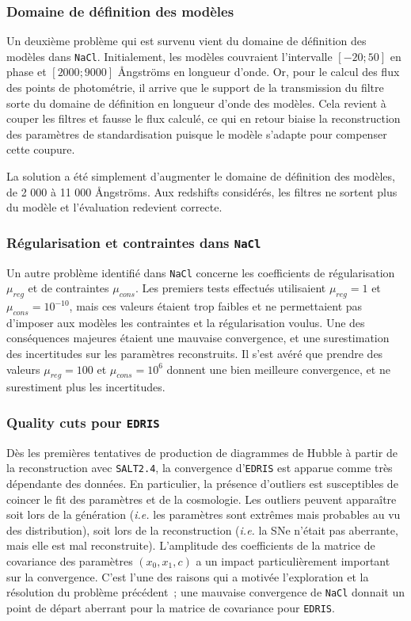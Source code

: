 \documentclass{book}
\def\nacl{\texttt{NaCl}\xspace}
\def\edris{\texttt{EDRIS}\xspace}
\def\saltd{\texttt{SALT2.4}\xspace}
\begin{document}
\subsubsection{Domaine de définition des modèles}

Un deuxième problème qui est survenu vient du domaine de définition des modèles dans \nacl. Initialement, les modèles couvraient l'intervalle $[-20; 50]$ en phase et $[2000; 9000]$ Ångströms en longueur d'onde. Or, pour le calcul des flux des points de photométrie, il arrive que le support de la transmission du filtre sorte du domaine de définition en longueur d'onde des modèles. Cela revient à couper les filtres et fausse le flux calculé, ce qui en retour biaise la reconstruction des paramètres de standardisation puisque le modèle s'adapte pour compenser cette coupure.

La solution a été simplement d'augmenter le domaine de définition des modèles, de 2 000 à 11 000 Ångströms. Aux redshifts considérés, les filtres ne sortent plus du modèle et l'évaluation redevient correcte.

\subsubsection{Régularisation et contraintes dans \nacl}

Un autre problème identifié dans \nacl concerne les coefficients de régularisation $\mu_{reg}$ et de contraintes $\mu_{cons}$. Les premiers tests effectués utilisaient $\mu_{reg} = 1$ et $\mu_{cons} = 10^{-10}$, mais ces valeurs étaient trop faibles et ne permettaient pas d'imposer aux modèles les contraintes et la régularisation voulus. Une des conséquences majeures étaient une mauvaise convergence, et une surestimation des incertitudes sur les paramètres reconstruits.
Il s'est avéré que prendre des valeurs $\mu_{reg} = 100$ et $\mu_{cons} = 10^6$ donnent une bien meilleure convergence, et ne surestiment plus les incertitudes.

\subsubsection{Quality cuts pour \edris}
\label{sec:qc_edris}
Dès les premières tentatives de production de diagrammes de Hubble à partir de la reconstruction avec \saltd, la convergence d'\edris est apparue comme très dépendante des données. En particulier, la présence d'outliers est susceptibles de coincer le fit des paramètres et de la cosmologie. Les outliers peuvent apparaître soit lors de la génération (\textit{i.e.} les paramètres sont extrêmes mais probables au vu des distribution), soit lors de la reconstruction (\textit{i.e.} la SNe n'était pas aberrante, mais elle est mal reconstruite). L'amplitude des coefficients de la matrice de covariance des paramètres $(x_0, x_1, c)$ a un impact particulièrement important sur la convergence. C'est l'une des raisons qui a motivée l'exploration et la résolution du problème précédent~; une mauvaise convergence de \nacl donnait un point de départ aberrant pour la matrice de covariance pour \edris.
\end{document}
